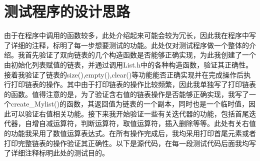 \documentclass[UTF8]{ctexart}
\begin{document}
\pagestyle{fancy}
\fancyhead{}

\section{测试程序的设计思路}
由于在程序中调用的函数较多，此处介绍起来可能会较为冗长，因此我在程序中写了详细的注释，标明了每一步想要测试的功能。此处仅对测试程序做一个整体的介绍。我首先验证了双向链表的几个构造函数是否能够正确实现，为此我创建了一个由初始化列表赋值的链表，并通过调用List.h中的各种构造函数，验证其正确性。接着我验证了链表的size(),empty(),clear()等功能能否正确实现并在完成操作后执行打印链表的操作。其中由于打印链表的操作比较频繁，因此我单独写了打印链表的函数。值得注意的是，为了验证含右值的链表操作是否能够正确实现，我写了一个create\_Mylist()的函数，其返回值为链表的一个副本，同时也是一个临时值，因此可以验证右值相关功能。接下来我开始验证一些有关迭代器的功能，包括首尾迭代器，自增自减运算符，判断运算符，取值运算符，插入删除等等。此处有关右值的功能我采用了数值运算表达式。在所有操作完成后，我均采用打印首尾元素或者打印完整链表的操作验证其正确性。以下是源代码，在每一段测试代码后面我均写了详细注释标明此处的测试目的。
\end{document}
